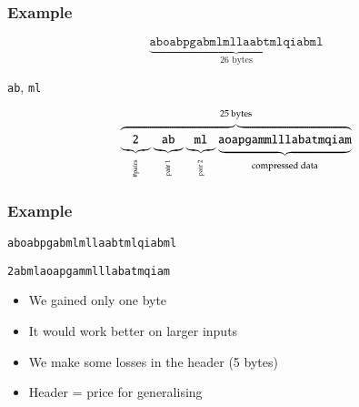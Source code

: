 \documentclass{../ucll-slides}
\begin{document}
\begin{frame}
  \frametitle{Example}
  \[
    \underbrace{\texttt{aboabpgabmlmllaabtmlqiabml}}_{\textrm{26 bytes}}
  \]
  \vskip5mm
  \begin{center}
    \texttt{ab}, \texttt{ml}
  \end{center}
  \vskip5mm
  \[
    \overbrace{
      \underbrace{\texttt{2}}_{\rotatebox{90}{\tiny\textrm{\#pairs}}}
      \underbrace{\texttt{ab}}_{\rotatebox{90}{\tiny\textrm{pair 1}}}
      \underbrace{\texttt{ml}}_{\rotatebox{90}{\tiny\textrm{pair 2}}}
      \underbrace{\texttt{aoapgammlllabatmqiam}}_{\tiny\textrm{compressed data}}}
    ^{\textrm{25 bytes}}
  \]
\end{frame}

\begin{frame}
  \frametitle{Example}
  \begin{center}
    \texttt{aboabpgabmlmllaabtmlqiabml}
  \end{center}
  \begin{center}
    \texttt{2abmlaoapgammlllabatmqiam}
  \end{center}
  \begin{itemize}
    \item We gained only one byte
    \item It would work better on larger inputs
    \item We make some losses in the header (5 bytes)
    \item Header = price for generalising
  \end{itemize}
\end{frame}
\end{document}
